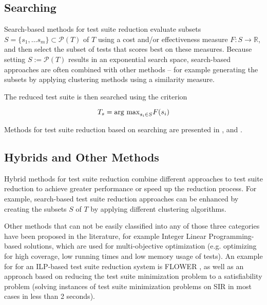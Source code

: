 \subsection{Searching}

Search-based methods for test suite reduction evaluate subsets
$S=\{s_1, \dots s_m\} \subset \mathcal{P}(T)$ of $T$ using a cost
and/or effectiveness measure $F: S \rightarrow \mathbb{R}$, and then
select the subset of tests that scores best on these measures. Because
setting $S:=\mathcal{P}(T)$ results in an exponential search space,
search-based approaches are often combined with other methods – for
example generating the subsets by applying clustering methods using a
similarity measure.

The reduced test suite is then searched using the criterion

$$T_s=\hbox{arg max}_{s_i \in S} F(s_i)$$

Methods for test suite reduction based on searching are presented in
\cite{coutinho2013test}, and \cite{wang2014cost}.

\subsection{Hybrids and Other Methods}

Hybrid methods for test suite reduction combine different approaches
to test suite reduction to achieve greater performance or speed up
the reduction process. For example, search-based test suite reduction
approaches can be enhanced by creating the subsets $S$ of $T$ by applying
different clustering algorithms.

Other methods that can not be easily classified into any of those three
categories have been proposed in the literature, for example Integer
Linear Programming-based solutions, which are used for multi-objective
optimization (e.g. optimizing for high coverage, low running times
and low memory usage of tests). An example for for an ILP-based test
suite reduction system is FLOWER \cite{gotlieb2014flower}, as well as
an approach based on reducing the test suite minimization problem to a
satisfiability problem \cite{arito2012application} (solving instances
of test suite minimization problems on SIR \cite{dosupporting2005}
in most cases in less than 2 seconds).
